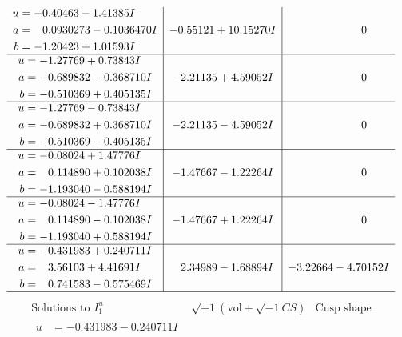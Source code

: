 \documentclass[1p]{elsarticle_modified}
\theoremstyle{definition}
\newcommand{\I}{\sqrt{-1}}
\begin{document}
$$\begin{array}{c|c|c}
\begin{aligned}
u &= -0.40463 - 1.41385 I \\
a &= \phantom{-}0.0930273 - 0.1036470 I \\
b &= -1.20423 + 1.01593 I\end{aligned}
 & -0.55121 + 10.15270 I & \phantom{-0.000000 } 0 \\ \hline\begin{aligned}
u &= -1.27769 + 0.73843 I \\
a &= -0.689832 - 0.368710 I \\
b &= -0.510369 + 0.405135 I\end{aligned}
 & -2.21135 + 4.59052 I & \phantom{-0.000000 } 0 \\ \hline\begin{aligned}
u &= -1.27769 - 0.73843 I \\
a &= -0.689832 + 0.368710 I \\
b &= -0.510369 - 0.405135 I\end{aligned}
 & -2.21135 - 4.59052 I & \phantom{-0.000000 } 0 \\ \hline\begin{aligned}
u &= -0.08024 + 1.47776 I \\
a &= \phantom{-}0.114890 + 0.102038 I \\
b &= -1.193040 - 0.588194 I\end{aligned}
 & -1.47667 - 1.22264 I & \phantom{-0.000000 } 0 \\ \hline\begin{aligned}
u &= -0.08024 - 1.47776 I \\
a &= \phantom{-}0.114890 - 0.102038 I \\
b &= -1.193040 + 0.588194 I\end{aligned}
 & -1.47667 + 1.22264 I & \phantom{-0.000000 } 0 \\ \hline\begin{aligned}
u &= -0.431983 + 0.240711 I \\
a &= \phantom{-}3.56103 + 4.41691 I \\
b &= \phantom{-}0.741583 - 0.575469 I\end{aligned}
 & \phantom{-}2.34989 - 1.68894 I & -3.22664 - 4.70152 I\\
 \hline 
 \end{array}$$\newpage$$\begin{array}{c|c|c}  
\text{Solutions to }I^u_{1}& \I (\text{vol} + \sqrt{-1}CS) & \text{Cusp shape}\\
 \hline 
\begin{aligned}
u &= -0.431983 - 0.240711 I \\

\end{aligned}
\end{array}$$
\end{document}
